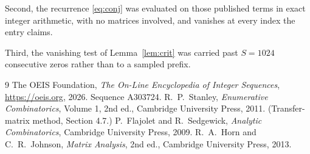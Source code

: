 \documentclass[11pt,a4paper]{article}
\theoremstyle{plain}
\theoremstyle{definition}
\begin{document}
Second, the recurrence \eqref{eq:conj} was evaluated on those published terms in exact
integer arithmetic, with no matrices involved, and vanishes at every index the entry claims.

Third, the vanishing test of Lemma~\ref{lem:crit} was carried past $S=1024$ consecutive
zeros rather than to a sampled prefix.

\begin{thebibliography}{9}
 The OEIS Foundation, \emph{The On-Line Encyclopedia of Integer
Sequences}, \url{https://oeis.org}, 2026. Sequence A303724.
 R.~P.~Stanley, \emph{Enumerative Combinatorics}, Volume 1, 2nd ed.,
Cambridge University Press, 2011. (Transfer-matrix method, Section 4.7.)
 P.~Flajolet and R.~Sedgewick, \emph{Analytic Combinatorics}, Cambridge
University Press, 2009.
 R.~A.~Horn and C.~R.~Johnson, \emph{Matrix Analysis}, 2nd ed., Cambridge
University Press, 2013.
\end{thebibliography}
\end{document}
